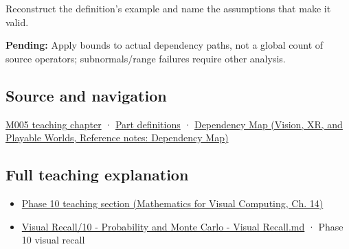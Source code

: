 Reconstruct the definition's example and name the assumptions that make it valid.

\textbf{Pending:} Apply bounds to actual dependency paths, not a global count of source operators; subnormals/range failures require other analysis.

\subsection{Source and navigation}\label{appendix-f82e270791c8-source-and-navigation}

\hyperref[01-foundations-i-ch001-when-arithmetic-meets-uncertainty]{M005 teaching chapter} · \hyperref[appendix-fd090d982a15-m005---parts-77-88]{Part definitions} · \href{../07-Vision-XR-and-Playable-Worlds/main.pdf\#nameddest=appendix-4ad47bdd269a}{Dependency Map (Vision, XR, and Playable Worlds, Reference notes: Dependency Map)}

\subsection{Full teaching explanation}\label{appendix-f82e270791c8-full-teaching-explanation}

\begin{itemize}
\tightlist
\item
  \href{../02-Mathematics-for-Visual-Computing/main.pdf\#nameddest=02-foundations-ii-ch030-finite-samples-need-stable-descriptive-statistics}{Phase 10 teaching section (Mathematics for Visual Computing, Ch. 14)}
\item
  \hyperref[appendix-cb5af353ef77]{Visual Recall/10 - Probability and Monte Carlo - Visual Recall.md} · Phase 10 visual recall
\end{itemize}

